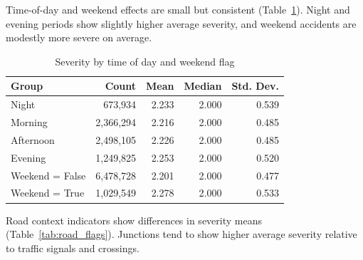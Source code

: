 \documentclass[11pt]{article}
\begin{document}
Time-of-day and weekend effects are small but consistent (Table~\ref{tab:time_weekend}). Night and evening periods show slightly higher average severity, and weekend accidents are modestly more severe on average.

\begin{table}[H]
    \centering
    \caption{Severity by time of day and weekend flag}
    \label{tab:time_weekend}
    \begin{tabular}{lrrrr}
        \toprule
        Group           & Count         & Mean  & Median & Std. Dev. \\
        \midrule
        Night           & 673{,}934     & 2.233 & 2.000  & 0.539     \\
        Morning         & 2{,}366{,}294 & 2.216 & 2.000  & 0.485     \\
        Afternoon       & 2{,}498{,}105 & 2.226 & 2.000  & 0.485     \\
        Evening         & 1{,}249{,}825 & 2.253 & 2.000  & 0.520     \\
        Weekend = False & 6{,}478{,}728 & 2.201 & 2.000  & 0.477     \\
        Weekend = True  & 1{,}029{,}549 & 2.278 & 2.000  & 0.533     \\
        \bottomrule
    \end{tabular}
\end{table}

Road context indicators show differences in severity means (Table~\ref{tab:road_flags}). Junctions tend to show higher average severity relative to traffic signals and crossings.
\end{document}
